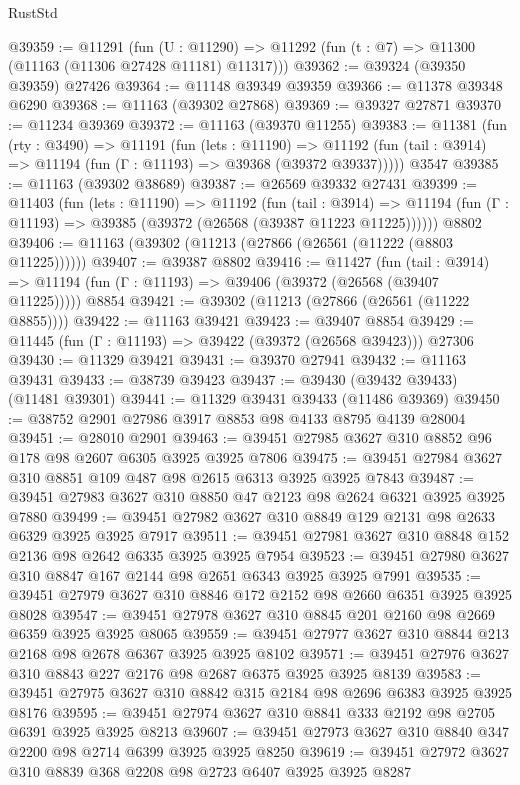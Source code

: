 \begin{lexlean}{RustStd}
\begin{coremodule}
@39359 := @11291
    (fun (U : @11290) => @11292 (fun (t : @7) => @11300 (@11163 (@11306 @27428 @11181) @11317)))
@39362 := @39324 (@39350 @39359) @27426
@39364 := @11148 @39349 @39359
@39366 := @11378 @39348 @6290
@39368 := @11163 (@39302 @27868)
@39369 := @39327 @27871
@39370 := @11234 @39369
@39372 := @11163 (@39370 @11255)
@39383 := @11381
    (fun (rty : @3490) =>
    @11191
      (fun (lets : @11190) =>
      @11192 (fun (tail : @3914) => @11194 (fun (Γ : @11193) => @39368 (@39372 @39337)))))
    @3547
@39385 := @11163 (@39302 @38689)
@39387 := @26569 @39332 @27431
@39399 := @11403
    (fun (lets : @11190) =>
    @11192
      (fun (tail : @3914) =>
      @11194 (fun (Γ : @11193) => @39385 (@39372 (@26568 (@39387 @11223 @11225))))))
    @8802
@39406 := @11163 (@39302 (@11213 (@27866 (@26561 (@11222 (@8803 @11225))))))
@39407 := @39387 @8802
@39416 := @11427
    (fun (tail : @3914) => @11194 (fun (Γ : @11193) => @39406 (@39372 (@26568 (@39407 @11225)))))
    @8854
@39421 := @39302 (@11213 (@27866 (@26561 (@11222 @8855))))
@39422 := @11163 @39421
@39423 := @39407 @8854
@39429 := @11445 (fun (Γ : @11193) => @39422 (@39372 (@26568 @39423))) @27306
@39430 := @11329 @39421
@39431 := @39370 @27941
@39432 := @11163 @39431
@39433 := @38739 @39423
@39437 := @39430 (@39432 @39433) (@11481 @39301)
@39441 := @11329 @39431 @39433 (@11486 @39369)
@39450 := @38752 @2901 @27986 @3917 @8853 @98 @4133 @8795 @4139 @28004
@39451 := @28010 @2901
@39463 := @39451 @27985 @3627 @310 @8852 @96 @178 @98 @2607 @6305 @3925 @3925 @7806
@39475 := @39451 @27984 @3627 @310 @8851 @109 @487 @98 @2615 @6313 @3925 @3925 @7843
@39487 := @39451 @27983 @3627 @310 @8850 @47 @2123 @98 @2624 @6321 @3925 @3925 @7880
@39499 := @39451 @27982 @3627 @310 @8849 @129 @2131 @98 @2633 @6329 @3925 @3925 @7917
@39511 := @39451 @27981 @3627 @310 @8848 @152 @2136 @98 @2642 @6335 @3925 @3925 @7954
@39523 := @39451 @27980 @3627 @310 @8847 @167 @2144 @98 @2651 @6343 @3925 @3925 @7991
@39535 := @39451 @27979 @3627 @310 @8846 @172 @2152 @98 @2660 @6351 @3925 @3925 @8028
@39547 := @39451 @27978 @3627 @310 @8845 @201 @2160 @98 @2669 @6359 @3925 @3925 @8065
@39559 := @39451 @27977 @3627 @310 @8844 @213 @2168 @98 @2678 @6367 @3925 @3925 @8102
@39571 := @39451 @27976 @3627 @310 @8843 @227 @2176 @98 @2687 @6375 @3925 @3925 @8139
@39583 := @39451 @27975 @3627 @310 @8842 @315 @2184 @98 @2696 @6383 @3925 @3925 @8176
@39595 := @39451 @27974 @3627 @310 @8841 @333 @2192 @98 @2705 @6391 @3925 @3925 @8213
@39607 := @39451 @27973 @3627 @310 @8840 @347 @2200 @98 @2714 @6399 @3925 @3925 @8250
@39619 := @39451 @27972 @3627 @310 @8839 @368 @2208 @98 @2723 @6407 @3925 @3925 @8287

\end{coremodule}
\end{lexlean}
